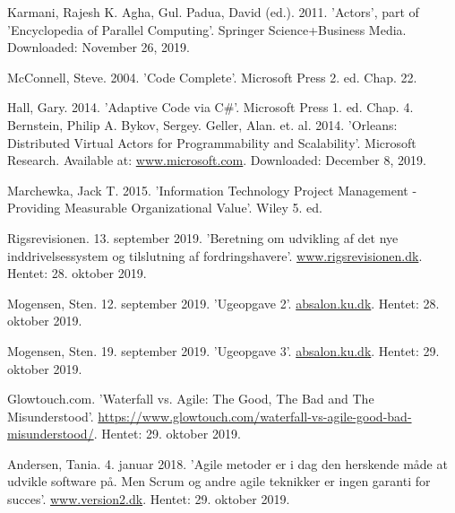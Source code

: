 \begin{thebibliography}{9}
Karmani, Rajesh K. Agha, Gul. Padua, David (ed.). 2011. 'Actors', part of 'Encyclopedia of Parallel Computing'. Springer Science+Business Media. Downloaded: November 26, 2019.

McConnell, Steve. 2004. 'Code Complete'. Microsoft Press 2. ed. Chap. 22.

Hall, Gary. 2014. 'Adaptive Code via C\#'. Microsoft Press 1. ed. Chap. 4.
Bernstein, Philip A. Bykov, Sergey. Geller, Alan. et. al. 2014. 'Orleans: Distributed Virtual Actors for Programmability and Scalability'. Microsoft Research. Available at: \url{www.microsoft.com}. Downloaded: December 8, 2019.

Marchewka, Jack T. 2015. 'Information Technology Project Management - Providing Measurable Organizational Value'. Wiley 5. ed.

Rigsrevisionen. 13. september 2019. 'Beretning om udvikling af det nye inddrivelsessystem og tilslutning af fordringshavere'. \url{www.rigsrevisionen.dk}. Hentet: 28. oktober 2019.

Mogensen, Sten. 12. september 2019. 'Ugeopgave 2'. \url{absalon.ku.dk}. Hentet: 28. oktober 2019.

Mogensen, Sten. 19. september 2019. 'Ugeopgave 3'. \url{absalon.ku.dk}. Hentet: 29. oktober 2019.

Glowtouch.com. 'Waterfall vs. Agile: The Good, The Bad and The Misunderstood'. \url{https://www.glowtouch.com/waterfall-vs-agile-good-bad-misunderstood/}. Hentet: 29. oktober 2019.

Andersen, Tania. 4. januar 2018. 'Agile metoder er i dag den herskende måde at udvikle software på. Men Scrum og andre agile teknikker er ingen garanti for succes'. \url{www.version2.dk}. Hentet: 29. oktober 2019.
\end{thebibliography}